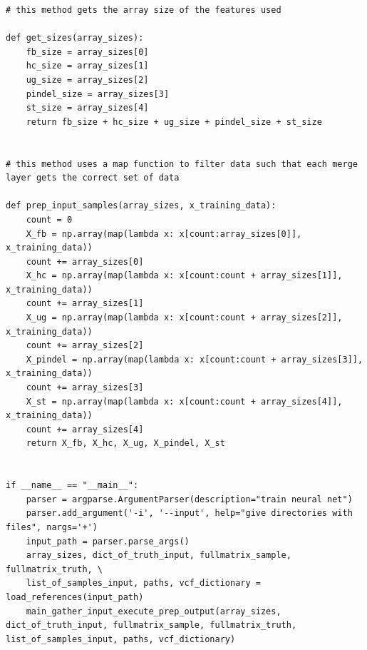 \documentclass{article}
\begin{document}
\begin{verbatim}
# this method gets the array size of the features used

def get_sizes(array_sizes):
    fb_size = array_sizes[0]
    hc_size = array_sizes[1]
    ug_size = array_sizes[2]
    pindel_size = array_sizes[3]
    st_size = array_sizes[4]
    return fb_size + hc_size + ug_size + pindel_size + st_size

	
# this method uses a map function to filter data such that each merge layer gets the correct set of data

def prep_input_samples(array_sizes, x_training_data):
    count = 0
    X_fb = np.array(map(lambda x: x[count:array_sizes[0]], x_training_data))
    count += array_sizes[0]
    X_hc = np.array(map(lambda x: x[count:count + array_sizes[1]], x_training_data))
    count += array_sizes[1]
    X_ug = np.array(map(lambda x: x[count:count + array_sizes[2]], x_training_data))
    count += array_sizes[2]
    X_pindel = np.array(map(lambda x: x[count:count + array_sizes[3]], x_training_data))
    count += array_sizes[3]
    X_st = np.array(map(lambda x: x[count:count + array_sizes[4]], x_training_data))
    count += array_sizes[4]
    return X_fb, X_hc, X_ug, X_pindel, X_st


if __name__ == "__main__":
    parser = argparse.ArgumentParser(description="train neural net")
    parser.add_argument('-i', '--input', help="give directories with files", nargs='+')
    input_path = parser.parse_args()
    array_sizes, dict_of_truth_input, fullmatrix_sample, fullmatrix_truth, \
    list_of_samples_input, paths, vcf_dictionary = load_references(input_path)
    main_gather_input_execute_prep_output(array_sizes, dict_of_truth_input, fullmatrix_sample, fullmatrix_truth, list_of_samples_input, paths, vcf_dictionary)
\end{verbatim}
\end{document}
